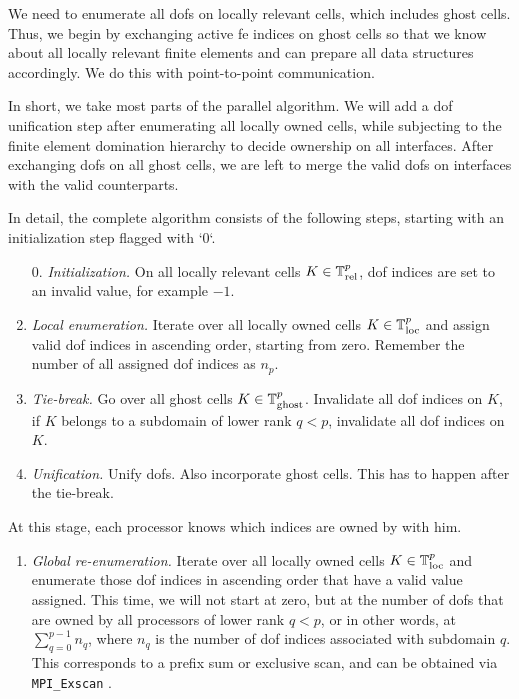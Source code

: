 We need to enumerate all \glspl{dof} on locally relevant cells, which includes ghost cells. Thus, we begin by exchanging active fe indices on ghost cells so that we know about all locally relevant finite elements and can prepare all data structures accordingly. We do this with point-to-point communication.

In short, we take most parts of the parallel algorithm. We will add a \gls{dof} unification step after enumerating all locally owned cells, while subjecting to the finite element domination hierarchy to decide ownership on all interfaces. After exchanging \glspl{dof} on all ghost cells, we are left to merge the valid \glspl{dof} on interfaces with the valid counterparts.

In detail, the complete algorithm consists of the following steps, starting with an initialization step flagged with `0`.
\begin{enumerate}
  \item[0.] \textit{Initialization.}
  On all locally relevant cells $K \in \mathbb{T}^p_{\text{rel}}$, \gls{dof} indices are set to an invalid value, for example $-1$.
  \item \textit{Local enumeration.}
  Iterate over all locally owned cells $K \in \mathbb{T}^p_{\text{loc}}$ and assign valid \gls{dof} indices in ascending order, starting from zero. Remember the number of all assigned \gls{dof} indices as $n_p$.
  \item \textit{Tie-break.}
  Go over all ghost cells $K \in \mathbb{T}^p_{\text{ghost}}$. Invalidate all \gls{dof} indices on $K$, if $K$ belongs to a subdomain of lower rank $q < p$, invalidate all \gls{dof} indices on $K$.
  \item \textit{Unification.}
  Unify \glspl{dof}. Also incorporate ghost cells. This has to happen after the tie-break.
\end{enumerate}
At this stage, each processor knows which indices are owned by with him.
\begin{enumerate}[resume]
  \item \textit{Global re-enumeration.}
  Iterate over all locally owned cells $K \in \mathbb{T}^p_{\text{loc}}$
  and enumerate those \gls{dof} indices in ascending order that have a valid value assigned. This time, we will not start at zero, but at the number of \glspl{dof} that are owned by all processors of lower rank $q < p$, or in other words, at $\sum_{q=0}^{p-1} n_q$, where $n_q$ is the number of \gls{dof} indices associated with subdomain $q$. This corresponds to a prefix sum or exclusive scan, and can be obtained via \texttt{MPI\_Exscan} \parencite{mpi31}.
\end{enumerate}
